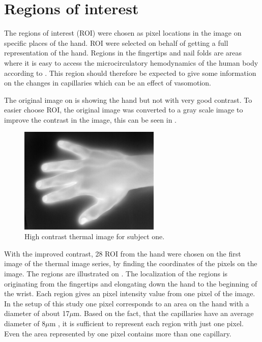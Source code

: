 \section{Regions of interest}

The regions of interest (ROI) were chosen as pixel locations in the image on specific places of the hand. ROI were selected on behalf of getting a full representation of the hand. 
Regions in the fingertips and nail folds are areas where it is easy to access the microcirculatory hemodynamics of the human body according to \cite{Iabichella2006}. This region should therefore be expected to give some information on the changes in capillaries which can be an effect of vasomotion. 

The original image on  is showing the hand but not with very good contrast. To easier choose ROI, the original image was converted to a gray scale image to improve the contrast in the image, this can be seen in . 

\begin{figure}[H]
	\includegraphics[width=0.6\textwidth]{figures/mat2grayHand}  %
	\caption{High contrast thermal image for subject one.}
	\label{fig:mat2grayHand}  %
\end{figure}

With the improved contrast, 28 ROI from the hand were chosen on the first image of the thermal image series, by finding the coordinates of the pixels on the image. The regions are illustrated on . The localization of the regions is originating from the fingertips and elongating down the hand to the beginning of the wrist. Each region gives an pixel intensity value from one pixel of the image. In the setup of this study one pixel corresponds to an area on the hand with a diameter of about 17$\mu$m. Based on the fact, that the capillaries have an average diameter of 8$\mu$m \cite{martini2012}, it is sufficient to represent each region with just one pixel. Even the area represented by one pixel contains more than one capillary.


